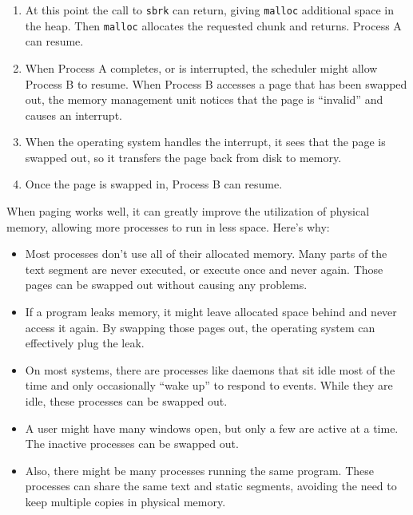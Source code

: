 \documentclass[12pt]{book}
\begin{document}
{\begin{enumerate}
\item At this point the call to {\tt sbrk} can return, giving {\tt malloc}
additional space in the heap.  Then {\tt malloc} allocates the requested
chunk and returns.  Process A can resume.

\item When Process A completes, or is interrupted, the scheduler might
allow Process B to resume.  When Process B accesses a page that has been swapped out, the memory management unit notices that the page is ``invalid'' and causes an interrupt.

\item When the operating system handles the interrupt, it sees that
the page is swapped out, so it transfers the page back from disk to
memory.  

\item Once the page is swapped in, Process B can resume.

\end{enumerate}

When paging works well, it can greatly improve the utilization of
physical memory, allowing more processes to run in less space.
Here's why:

\begin{itemize}

\item Most processes don't use all of their allocated memory.  Many
  parts of the text segment are never executed, or execute once and
  never again.  Those pages can be swapped out without causing any
  problems.

\item If a program leaks memory, it might leave allocated space behind
  and never access it again.  By swapping those pages out, the
  operating system can effectively plug the leak.

\item On most systems, there are processes like daemons that sit idle
  most of the time and only occasionally ``wake up'' to respond to
  events.  While they are idle, these processes can be swapped out.

\item A user might have many windows open, but only a few are active
  at a time.  The inactive processes can be swapped out.

\item Also, there might be many processes running the same program.
  These processes can share the same text and static segments, avoiding the need to keep multiple copies in physical memory.


\end{itemize}}
\end{document}
